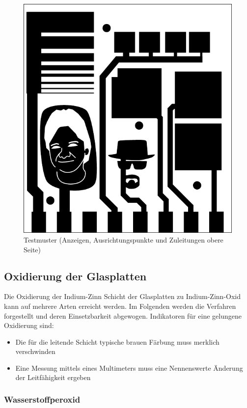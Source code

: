 \begin{figure}[t]
  \centering
  \includegraphics[width=\linewidth, keepaspectratio]{Bilder/testmuster-seite2}
  \caption{Testmuster (Anzeigen, Ausrichtungspunkte und Zuleitungen obere Seite)}
  \label{testmuster-seite2}
\end{figure}

\subsection{Oxidierung der Glasplatten}

Die Oxidierung der Indium-Zinn Schicht der Glasplatten zu Indium-Zinn-Oxid kann auf mehrere Arten erreicht werden. Im Folgenden werden die Verfahren forgestellt und deren Einsetzbarkeit abgewogen.
Indikatoren für eine gelungene Oxidierung sind:
\begin{itemize}
\item Die für die leitende Schicht typische brauen Färbung muss merklich verschwinden
\item Eine Messung mittels eines Multimeters muss eine Nennenswerte Änderung der Leitfähigkeit ergeben
\end{itemize}

\subsubsection{Wasserstoffperoxid}

